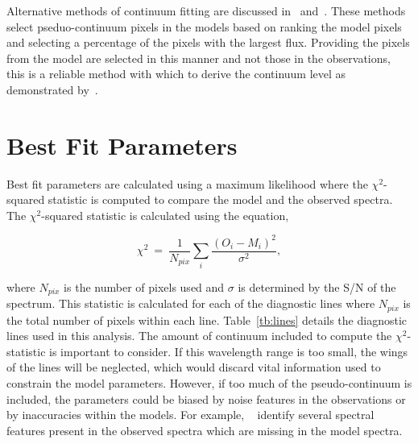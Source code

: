 
Alternative methods of continuum fitting are discussed in~\cite{2010MNRAS.407.1203D} and~\cite{2011A&A...527A..50E}.
These methods select pseduo-continuum pixels in the models based on ranking the model pixels and selecting a percentage of the pixels with the largest flux.
Providing the pixels from the model are selected in this manner and not those in the observations, this is a reliable method with which to derive the continuum level as demonstrated by~\cite{2015ApJ...806...21D}.

\section{Best Fit Parameters} %
\label{sub:best_fit_parameters}

Best fit parameters are calculated using a maximum likelihood where the $\chi^{2}$-squared statistic is computed to compare the model and the observed spectra.
The $\chi^{2}$-squared statistic is calculated using the equation,

\begin{equation}
    \chi^{2}~=~\frac{1}{N_{pix}}\sum\limits_{i}{\frac{(O_{i} - M_{i})^{2}}{\sigma^{2}}},\label{eq:chisq}
\end{equation}

where $N_{pix}$ is the number of pixels used
and $\sigma$ is determined by the S/N of the spectrum.
This statistic is calculated for each of the diagnostic lines where $N_{pix}$ is the total number of pixels within each line.
Table~\ref{tb:lines} details the diagnostic lines used in this analysis.
The amount of continuum included to compute the $\chi^{2}$-statistic is important to consider.
If this wavelength range is too small, the wings of the lines will be neglected,
which would discard vital information used to constrain the model parameters.
However, if too much of the pseudo-continuum is included, the parameters could be biased by noise features in the observations or by inaccuracies within the models.
For example,
~\cite{2014PhDT.........G} identify several spectral features present in the observed spectra which are missing in the model spectra.

